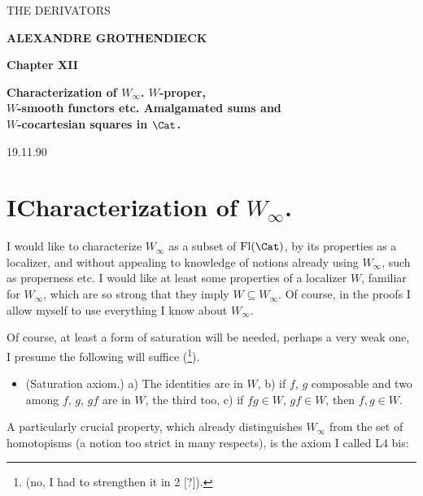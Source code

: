 \printedpage{--}

\begin{center}
{\Large \textsf{THE DERIVATORS}}

\bigskip

\textbf{ALEXANDRE GROTHENDIECK}

\bigskip\bigskip

\textbf{Chapter XII}

\medskip

\textbf{Characterization of $W_\infty$. $W$-proper,\\
$W$-smooth functors etc. Amalgamated sums and\\
$W$-cocartesian squares in $\Cat$.}
\end{center}

\clearpage

\printedpage{--}


\clearpage



\hfill 19.11.90

\section*{I\quad Characterization of $W_\infty$.}

I would like to characterize $W_\infty$ as a subset of $\mathrm{Fl}(\Cat)$, by its properties as a localizer, and without appealing to knowledge of notions already using $W_\infty$, such as properness etc. I would like at least some properties of a localizer $W$, familiar for $W_\infty$, which are so strong that they imply $W \subseteq W_\infty$. Of course, in the proofs I allow myself to use everything I know about $W_\infty$.

Of course, at least a form of saturation will be needed, perhaps a very weak one, I presume the following will suffice (\footnote{(no, I had to strengthen it in 2 [?]).}).

\begin{itemize}[leftmargin=*]
\item[\textbf{W(1)}] (Saturation axiom.) a) The identities are in $W$, b) if $f$, $g$ composable and two among $f$, $g$, $gf$ are in $W$, the third too, c) if $fg \in W$, $gf \in W$, then $f, g \in W$.
\end{itemize}

A particularly crucial property, which already distinguishes $W_\infty$ from the set of homotopisms (a notion too strict in many respects), is the axiom I called L4 bis:

